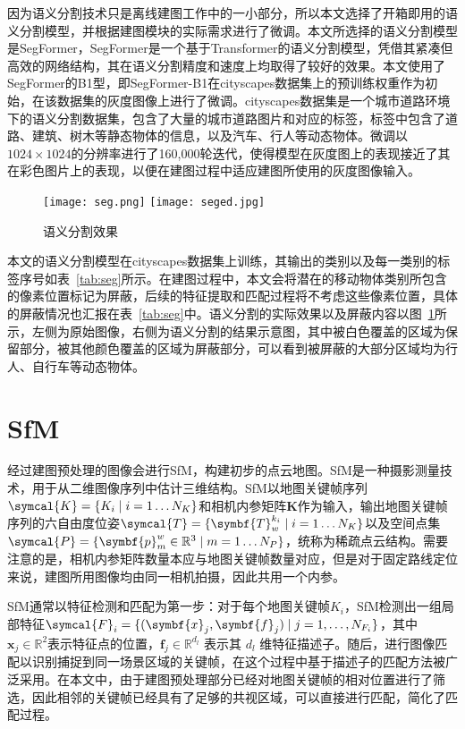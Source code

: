 因为语义分割技术只是离线建图工作中的一小部分，所以本文选择了开箱即用的语义分割模型，并根据建图模块的实际需求进行了微调。本文所选择的语义分割模型是SegFormer\cite{xie2021segformer}，SegFormer是一个基于Transformer的语义分割模型，凭借其紧凑但高效的网络结构，其在语义分割精度和速度上均取得了较好的效果。本文使用了SegFormer的B1型，即SegFormer-B1在cityscapes\cite{Cordts2016Cityscapes}数据集上的预训练权重作为初始，在该数据集的灰度图像上进行了微调。cityscapes数据集是一个城市道路环境下的语义分割数据集，包含了大量的城市道路图片和对应的标签，标签中包含了道路、建筑、树木等静态物体的信息，以及汽车、行人等动态物体。微调以$1024 \times 1024$的分辨率进行了160,000轮迭代，使得模型在灰度图上的表现接近了其在彩色图片上的表现，以便在建图过程中适应建图所使用的灰度图像输入。

\begin{figure}
  \centering
  \texttt{[image: seg.png]}
  \texttt{[image: seged.jpg]}
  \caption{语义分割效果}
  \label{fig:seg}
\end{figure}

本文的语义分割模型在cityscapes数据集上训练，其输出的类别以及每一类别的标签序号如表~\ref{tab:seg}所示。在建图过程中，本文会将潜在的移动物体类别所包含的像素位置标记为屏蔽，后续的特征提取和匹配过程将不考虑这些像素位置，具体的屏蔽情况也汇报在表~\ref{tab:seg}中。语义分割的实际效果以及屏蔽内容以图~\ref{fig:seg}所示，左侧为原始图像，右侧为语义分割的结果示意图，其中被白色覆盖的区域为保留部分，被其他颜色覆盖的区域为屏蔽部分，可以看到被屏蔽的大部分区域均为行人、自行车等动态物体。

\section{SfM}

经过建图预处理的图像会进行SfM，构建初步的点云地图。SfM是一种摄影测量技术，用于从二维图像序列中估计三维结构\cite{schonberger2016structure}。SfM以地图关键帧序列$\symcal{K} = \{K_i \mid i=1 \ldots N_{K} \}$和相机内参矩阵$\symbf{K}$作为输入，输出地图关键帧序列的六自由度位姿$\symcal{T} = \{\symbf{T}^{k_i}_w \mid i=1 \ldots N_K \}$以及空间点集$\symcal{P} = \{\symbf{p}_{m}^{w} \in \mathbb{R}^3 \mid m=1 \ldots N_P\}$，统称为稀疏点云结构。需要注意的是，相机内参矩阵数量本应与地图关键帧数量对应，但是对于固定路线定位来说，建图所用图像均由同一相机拍摄，因此共用一个内参。

SfM通常以特征检测和匹配为第一步：对于每个地图关键帧$K_i$，SfM检测出一组局部特征$\symcal{F}_i = \{(\symbf{x}_j, \symbf{f}_j) \mid j = 1, \ldots, N_{F_i}\}$，其中 $\symbf{x}_j \in \mathbb{R}^2$表示特征点的位置，$\symbf{f}_j \in \mathbb{R}^{d_l}$ 表示其 ${d_l}$ 维特征描述子。随后，进行图像匹配以识别捕捉到同一场景区域的关键帧，在这个过程中基于描述子的匹配方法被广泛采用。在本文中，由于建图预处理部分已经对地图关键帧的相对位置进行了筛选，因此相邻的关键帧已经具有了足够的共视区域，可以直接进行匹配，简化了匹配过程。

